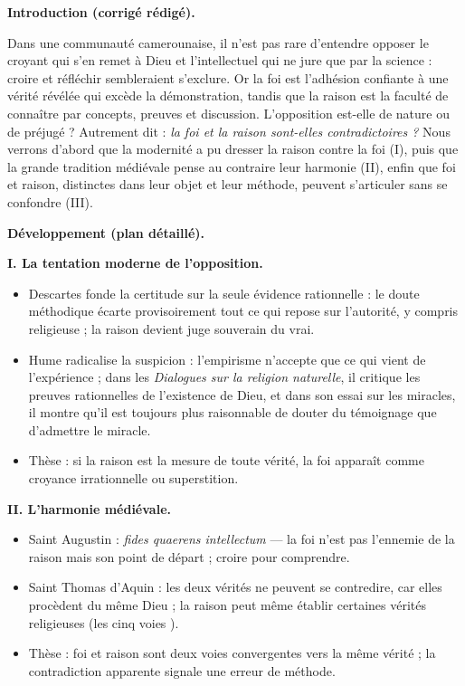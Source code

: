 \documentclass[11pt]{article}
\begin{document}
\begin{corrige}

\textbf{Introduction (corrigé rédigé).}\par Dans une communauté camerounaise, il n'est pas rare d'entendre opposer le \guillemotleft croyant \guillemotright qui s'en remet à Dieu et l'\guillemotleft intellectuel \guillemotright qui ne jure que par la science : croire et réfléchir sembleraient s'exclure. Or la foi est l'adhésion confiante à une vérité révélée qui excède la démonstration, tandis que la raison est la faculté de connaître par concepts, preuves et discussion. L'opposition est-elle de nature ou de préjugé ? Autrement dit : \emph{la foi et la raison sont-elles contradictoires ?} Nous verrons d'abord que la modernité a pu dresser la raison contre la foi (I), puis que la grande tradition médiévale pense au contraire leur harmonie (II), enfin que foi et raison, distinctes dans leur objet et leur méthode, peuvent s'articuler sans se confondre (III).

\textbf{Développement (plan détaillé).}\par

\textbf{I. La tentation moderne de l'opposition.}\par
\begin{itemize}
\item Descartes fonde la certitude sur la seule évidence rationnelle : le doute méthodique écarte provisoirement tout ce qui repose sur l'autorité, y compris religieuse ; la raison devient juge souverain du vrai.
\item Hume radicalise la suspicion : l'empirisme n'accepte que ce qui vient de l'expérience ; dans les \emph{Dialogues sur la religion naturelle}, il critique les preuves rationnelles de l'existence de Dieu, et dans son essai sur les miracles, il montre qu'il est toujours plus raisonnable de douter du témoignage que d'admettre le miracle.
\item Thèse : si la raison est la mesure de toute vérité, la foi apparaît comme croyance irrationnelle ou superstition.
\end{itemize}

\textbf{II. L'harmonie médiévale.}\par
\begin{itemize}
\item Saint Augustin : \emph{fides quaerens intellectum} — la foi n'est pas l'ennemie de la raison mais son point de départ ; croire pour comprendre.
\item Saint Thomas d'Aquin : les deux vérités ne peuvent se contredire, car elles procèdent du même Dieu ; la raison peut même établir certaines vérités religieuses (les \guillemotleft cinq voies \guillemotright).
\item Thèse : foi et raison sont deux voies convergentes vers la même vérité ; la contradiction apparente signale une erreur de méthode.
\end{itemize}


\end{corrige}
\end{document}
